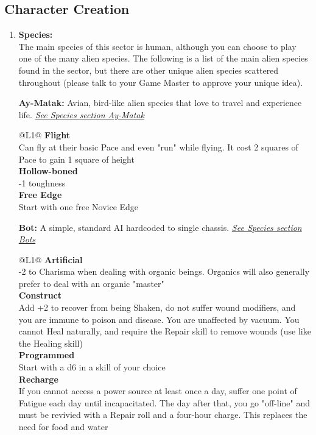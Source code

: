 \subsection{Character Creation}
\label{sec:rules-creation}

\begin{enumerate}

  \item \textbf{Species:}\\ The main species of this sector is human, although you can choose to play one of the many alien species. The following is a list of the main alien species found in the sector, but there are other unique alien species scattered throughout (please talk to your Game Master to approve your unique idea).
  
  \hline
  
  \textbf{Ay-Matak:} Avian, bird-like alien species that love to travel and experience life. \textit{\hyperref[sec:specie-ay-matak]{See Species section Ay-Matak}}
  \begin{redtable}{\linewidth}{@{}L{1}@{}}
    \textbf{Flight}\\
    Can fly at their basic Pace and even "run" while flying. It cost 2 squares of Pace to gain 1 square of height\\
    \textbf{Hollow-boned}\\
    -1 toughness\\
    \textbf{Free Edge}\\
    Start with one free Novice Edge
  \end{redtable}
  
  \hline
      
  \textbf{Bot:} A simple, standard AI hardcoded to single chassis. \textit{\hyperref[sec:specie-bots]{See Species section Bots}}
  \begin{redtable}{\linewidth}{@{}L{1}@{}}
    \textbf{Artificial}\\
    -2 to Charisma when dealing with organic beings. Organics will also generally prefer to deal with an organic "master"\\
    \textbf{Construct}\\
    Add +2 to recover from being Shaken, do not suffer wound modifiers, and you are immune to poison and disease. You are unaffected by vacuum. You cannot Heal naturally, and require the Repair skill to remove wounds (use like the Healing skill)\\
    \textbf{Programmed}\\
    Start with a d6 in a skill of your choice\\
    \textbf{Recharge}\\
    If you cannot access a power source at least once a day, suffer one point of Fatigue each day until incapacitated. The day after that, you go "off-line" and must be revivied with a Repair roll and a four-hour charge. This replaces the need for food and water\\
  \end{redtable}
  

\end{enumerate}
